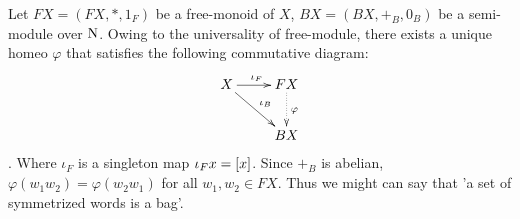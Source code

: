 Let $FX=(FX,*,1_F)$ be a free-monoid of $X$, $BX=(BX,+_B,0_B)$ be a semi-module over $\operatorname{N}$.
Owing to the universality of free-module,
there exists a unique homeo $\varphi$ that satisfies the following commutative diagram:
\begin{equation}\xymatrix{
	X \ar[r]^{\iota_F} \ar[rd]^{\iota_B} & FX \ar@{.>}[d]^{\varphi} \\
	& BX \\
}\end{equation}
. Where $\iota_F$ is a singleton map $\iota_F x=\left[{x}\right]$.
Since $+_B$ is abelian, $\varphi(w_1w_2)=\varphi(w_2w_1)$ for all $w_1,w_2\in FX$. Thus we might can say that 'a set of symmetrized words is a bag'.
